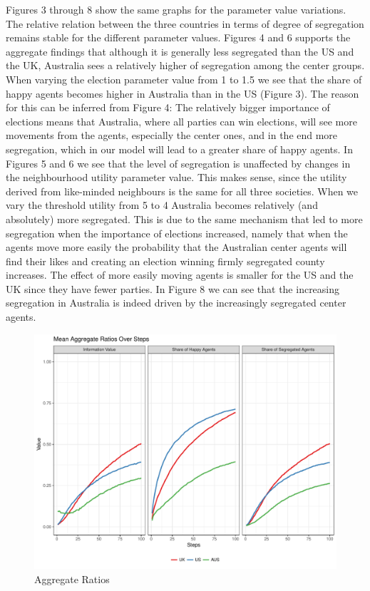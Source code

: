 \documentclass[12pt, a4paper]{article}
\begin{document}
	Figures 3 through 8 show the same graphs for the parameter value variations. The relative relation between the three countries in terms of degree of segregation remains stable for the different parameter values. Figures 4 and 6 supports the aggregate findings that although it is generally less segregated than the US and the UK, Australia sees a relatively higher of segregation among the center groups. When varying the election parameter value from 1 to 1.5 we see that the share of happy agents becomes higher in Australia than in the US (Figure 3). The reason for this can be inferred from Figure 4: The relatively bigger importance of elections means that Australia, where all parties can win elections, will see more movements from the agents, especially the center ones, and in the end more segregation, which in our model will lead to a greater share of happy agents. In Figures 5 and 6 we see that the level of segregation is unaffected by changes in the neighbourhood utility parameter value. This makes sense, since the utility derived from like-minded neighbours is the same for all three societies. When we vary the threshold utility from 5 to 4 Australia becomes relatively (and absolutely) more segregated. This is due to the same mechanism that led to more segregation when the importance of elections increased, namely that when the agents move more easily the probability that the Australian center agents will find their likes and creating an election winning firmly segregated county increases. The effect of more easily moving agents is smaller for the US and the UK since they have fewer parties. In Figure 8 we can see that the increasing segregation in Australia is indeed driven by the increasingly segregated center agents.        
	
	\begin{figure}[bp!]
		\centering
		\caption{Aggregate Ratios}
		\includegraphics[scale=0.6]{./Plots/agg_ratios.pdf}
	\end{figure}
	
\end{document}
